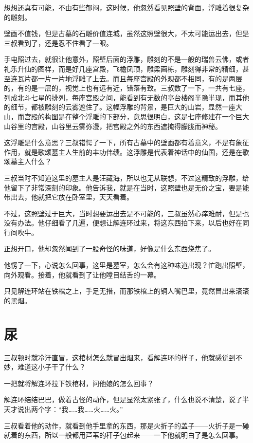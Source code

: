 想想还真有可能，不由有些郁闷，这时候，他忽然看见照壁的背面，浮雕着很复杂的雕刻。

壁画不值钱，但是古墓的石雕价值连城，虽然这照壁很大，不太可能运出去，但是三叔看到了，还是忍不住看了一眼。

手电照过去，就很让他意外，照壁后面的浮雕，雕刻的不是一般的瑞兽云佛，或者礼乐升仙的图样，而是好几座宫殿，飞檐凤顶，雕梁画栋，雕刻得非常的精细，甚至连瓦片都一片一片地浮雕了上去。而且每座宫殿的外观都不相同，有的是两层的，有的是一层的，视觉上也有远有近，错落有致。三叔数了一下，一共有七座，列成北斗七星的排列，每座宫殿之间，能看到有无数的亭台楼阁半隐半现，而其他的细节，都被雕刻的云雾遮住了。这幅浮雕的背景，是巨大的山岩，显然一座大山，而宫殿的构图是在整个浮雕的下部分，意思很明白，这是七座修建在一个巨大山谷里的宫殿，山谷里云雾弥漫，把宫殿之外的东西遮掩得朦胧而神秘。

这浮雕是什么意思？三叔错愕了一下，所有古墓中的壁画都有着意义，不是有象征作用，就是歌颂墓主人生前的丰功伟绩。这浮雕是代表着神话中的仙国，还是在歌颂墓主人什么？

三叔当时不知道这里的墓主人是汪藏海，所以也无从联想，不过这精致的浮雕，给他留下了非常深刻的印象。他告诉我，就是在当时，这照壁也是无价之宝，要是能带出去，他就把它放在卧室里，天天看着。

不过，这照壁过于巨大，当时想要运出去是不可能的，三叔虽然心痒难耐，但是也没有办法。他仔细看了几遍，便想让解连环过来，将这东西拍下来，以后也好在同行间吹牛。

正想开口，他却忽然闻到了一股奇怪的味道，好像是什么东西烧焦了。

他愣了一下，心说怎么回事，这里是墓室，怎么会有这种味道出现？忙跑出照壁，向外观看。接着，他就看到了让他瞠目结舌的一幕。

只见解连环站在铁棺之上，手足无措，而那铁棺上的铜人嘴巴里，竟然冒出来滚滚的黑烟。

\chapter{尿}

三叔顿时就冷汗直冒，这棺材怎么就冒出烟来，看解连环的样子，他就感觉到不妙，难道这小子干了什么？

一把就将解连环拉下铁棺材，问他娘的怎么回事？

解连环结结巴巴，做着古怪的动作，但是显然太紧张了，什么也说不清楚，说了半天才说出两个字：“我……我……火……火。”

三叔看着他的动作，就看到他手里拿的东西，那是火折子的盖子——火折子是一碰就着的东西，所以一般都用芦苇的秆子包起来——一下他就明白了是怎么回事。

